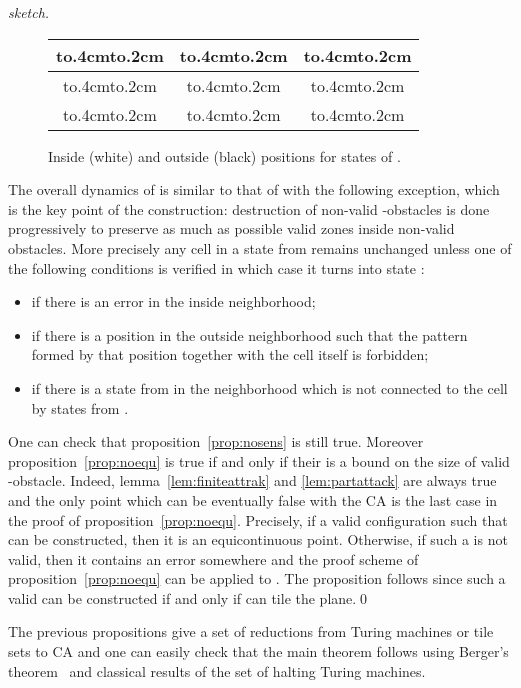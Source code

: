\documentclass{llncs}
\newcommand{\posin}{ }
\newcommand{\nslot}[1]{{\hbox to.4cm{\hfill\vbox to.2cm{\vfill \hbox{}\vfill}\hfill}}}
\newcommand{\outo}{-}
\begin{document}
\begin{proof}[sketch]
\begin{figure}
{\begin{tabular}{c|c|c}
        \nslot{\posin} & \nslot{\posin} & \nslot{\posin}\\
        \hline
        \nslot{\posin} & \nslot{\outo} & \nslot{\posin}\\
        \hline
        \nslot{\posin} & \nslot{\posin} & \nslot{\posin}
      \end{tabular}}
    \caption{Inside (white) and outside (black) positions for states
      of .}
    \label{fig:inout}
  \end{figure}
  The overall dynamics of  is similar to that of 
  with the following exception, which is the key point of the
  construction: destruction of non-valid -obstacles is done
  progressively to preserve as much as possible valid zones inside
  non-valid obstacles.  More precisely any cell in a state from 
  remains unchanged unless one of the following
  conditions is verified in which case it turns into state :
  \begin{itemize}
  \item if there is an error in the inside neighborhood;
  \item if there is a position in the outside neighborhood such that
    the pattern formed by that position together with the cell itself
    is forbidden;
  \item if there is a state from  in the  neighborhood
    which is not connected to the cell by states from .
  \end{itemize}
  One can check that proposition~\ref{prop:nosens} is still true.
  Moreover proposition~\ref{prop:noequ} is true if and only if their
  is a bound on the size of valid -obstacle. Indeed,
  lemma~\ref{lem:finiteattrak} and \ref{lem:partattack} are always
  true and the only point which can be eventually false with the CA
   is the last case in the proof of
  proposition~\ref{prop:noequ}. Precisely, if a valid configuration
   such that  can be constructed, then it
  is an equicontinuous point. Otherwise, if such a  is not valid,
  then it contains an error somewhere and the proof scheme of
  proposition~\ref{prop:noequ} can be applied to . The
  proposition follows since such a valid  can be constructed if and
  only if  can tile the plane.\qed
\end{proof}

The previous propositions give a set of reductions from
Turing machines or tile sets to CA and one can easily check that the
main theorem follows using Berger's theorem~\cite{berger} and
classical results of the set of halting Turing machines.
\end{document}
